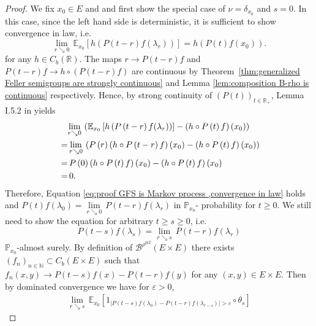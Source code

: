 \documentclass[a4paper,12pt]{article}
\theoremstyle{definition}
\theoremstyle{remark}
\numberwithin{equation}{section}
\numberwithin{theorem}{section}
\begin{document}
\begin{proof}
We fix $x_{0}\in E$ and  and first show the special case of $\nu=\delta_{x_0}$ and $s=0$. In this case, since the left hand side is
deterministic, it is sufficient to show convergence in law, i.e.~
\begin{equation}
\underset{r\searrow0}{\lim}\,\mathbb{E}_{x_{0}}\left[h\left(P\left(t-r\right)f(\lambda_{r})\right)\right]=h\left(P\left(t\right)f(x_{0})\right).\label{eq:proof GFS is Markov process ,convergence in law}
\end{equation}
for any $h\in C_{b}(\mathbb{R})$.
The maps
$
r \rightarrow P\left(t-r\right)f
$
and $P\left(t-r\right)f \rightarrow h\circ\left(P\left(t-r\right)f\right)$ are
 continuous by Theorem~\ref{thm:generalized Feller semigroups are strongly continuous} 
and Lemma \ref{lem:composition B-rho is continuous} respectively. 
Hence, by strong continuity of $\left(P(t)\right)_{t\in\mathbb{R}_{+}}$, Lemma I.5.2 in \cite{EnN}  yields
\begin{align*}
{\normalcolor } & \underset{r\searrow0}{\lim}\,\left(\mathbb{E}_{x_{0}}\left[h\left(P\left(t-r\right)f(\lambda_{r})\right)\right]-\left(h\circ P\left(t\right)f\right)(x_{0})\right)\\
{\normalcolor }  = &\,\underset{r\searrow0}{\lim}\,\left(P\left(r\right)\left(h\circ P\left(t-r\right)f\right)(x_{0})-\left(h\circ P\left(t\right)f\right)(x_{0})\right)\\
 =& \,P\left(0\right)\left(h\circ P\left(t\right)f\right)(x_{0})-\left(h\circ P\left(t\right)f\right)(x_{0})\\
 =& \,0.
\end{align*}
Therefore, Equation \eqref{eq:proof GFS is Markov process ,convergence in law}
holds and 
$
P\left(t\right)f(\lambda_{0})=\underset{r\searrow0}{\lim}\,P\left(t-r\right)f(\lambda_{r})
$
 in $\mathbb{P}_{x_{0}}$- probability for $t\geq0$. We still need to show the equation for arbitrary $t\geq s\geq0$, i.e.
\[
P\left(t-s\right)f(\lambda_{s})=\underset{r\searrow s}{\lim}\,P\left(t-r\right)f(\lambda_{r})
\]
$\mathbb{P}_{x_{0}}$-almost surely. 
By definition of $\mathscr{B}^{\rho^{\otimes 2}}\left(E\times E\right)$
there exists $\left(f_{n}\right)_{n\in\mathbb{N}}\subset C_{b}\left(E \times E \right)$
such that $f_{n}\left(x,y\right)\rightarrow P\left(t-s\right)f\left(x\right)-P\left(t-r\right)f\left(y\right)$
for any $\left(x,y\right)\in E \times E$. Then by dominated
convergence we have for
$\varepsilon>0$, 
\begin{align*}
 \underset{r\searrow s}{\lim}\,\mathbb{E}_{x_{0}}\left[1_{\left|P\left(t-s\right)f(\lambda_{0})-P\left(t-r\right)f(\lambda_{r-s})\right|>\varepsilon}\circ\theta_{s}\right]

\end{align*}
\end{proof}
\end{document}
